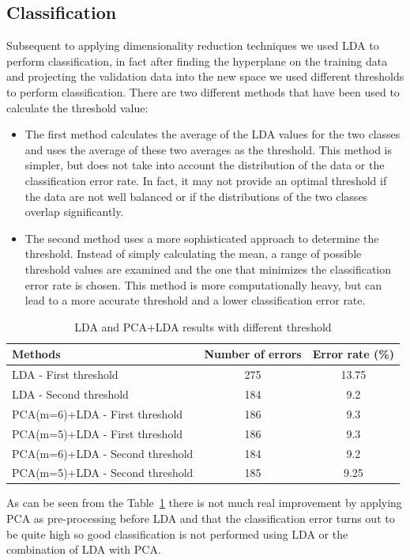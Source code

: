 \documentclass{article}
\begin{document}
\subsection{Classification}
Subsequent to applying dimensionality reduction techniques we used LDA to perform classification, in fact after finding the hyperplane on the training data and projecting the validation data into the new space we used different thresholds to perform classification.
There are two different methods that have been used to calculate the threshold value:
\begin{itemize}

\item The first method calculates the average of the LDA values for the two classes and uses the average of these two averages as the threshold. This method is simpler, but does not take into account the distribution of the data or the classification error rate. In fact, it may not provide an optimal threshold if the data are not well balanced or if the distributions of the two classes overlap significantly.
\item The second method uses a more sophisticated approach to determine the threshold. Instead of simply calculating the mean, a range of possible threshold values are examined and the one that minimizes the classification error rate is chosen. This method is more computationally heavy, but can lead to a more accurate threshold and a lower classification error rate.  
\end{itemize}
\begin{table}[H]
    \centering
    \begin{tabular}{lcc}
    \hline
    \textbf{Methods} & \textbf{Number of errors} & \textbf{Error rate (\%)} \\
    \hline
    LDA - First threshold & 275 & 13.75 \\
    LDA - Second threshold & 184 & 9.2 \\
    \hline
    PCA(m=6)+LDA - First threshold & 186 & 9.3 \\
    PCA(m=5)+LDA - First threshold & 186 & 9.3 \\
    PCA(m=6)+LDA - Second threshold & 184 & 9.2 \\
    PCA(m=5)+LDA - Second threshold & 185 & 9.25 \\
    \hline
    \end{tabular}
    \caption{LDA and PCA+LDA results with different threshold}
    \label{tab:resultsPCALDA}
\end{table}
As can be seen from the Table~\ref{tab:resultsPCALDA} there is not much real improvement by applying PCA as pre-processing before LDA and that the classification error turns out to be quite high so good classification is not performed using LDA or the combination of LDA with PCA.
\end{document}
